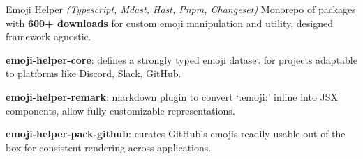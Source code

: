 

\begin{cventries}


\cventryproject
    {Emoji Helper} %
    {\emph{(Typescript, Mdast, Hast, Pnpm, Changeset)}}
    {} %
    {Monorepo of packages  with \textbf{600+ downloads} for custom emoji manipulation and utility, designed framework agnostic.} %
    {
      \begin{cvitems} %
        \item {\textbf{emoji-helper-core}: defines a strongly typed emoji dataset for projects adaptable to platforms like Discord, Slack, GitHub.}
        \item {\textbf{emoji-helper-remark}: markdown plugin to convert `:emoji:' inline into JSX components, allow fully customizable representations.}
        \item {\textbf{emoji-helper-pack-github}: curates GitHub's emojis readily usable out of the box for consistent rendering across applications.}
      \end{cvitems}
    }

\end{cventries}
